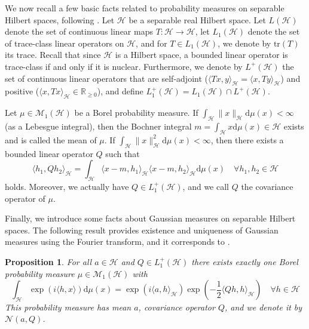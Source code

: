 \documentclass[letterpaper]{article} %
\newcommand{\R}{\mathbb{R}}
\newcommand{\Rnn}{\R_{\geq 0}}
\newcommand{\hs}[1]{\mathcal{#1}} %
\newcommand{\distributions}{\mathcal{M}_1} %
\newcommand{\Normal}{\mathcal{N}}
\newcommand{\tr}{\mathrm{tr}} %
\newtheorem{proposition}[theorem]{Proposition}
\begin{document}
We now recall a few basic facts related to probability measures on separable Hilbert spaces, following \cite{daprato2002second,daprato2006introduction}.
Let $\hs{H}$ be a separable real Hilbert space. %
Let $L(\hs{H})$ denote the set of continuous linear maps $T:\hs{H}\rightarrow\hs{H}$,
let $L_1(\hs{H})$ denote the set of trace-class linear operators on $\hs{H}$,
and for $T \in L_1(\hs{H})$, we denote by $\tr(T)$ its trace.
Recall that since $\hs{H}$ is a Hilbert space, a bounded linear operator is trace-class if and only if it is nuclear.
Furthermore, we denote by $L^+(\hs{H})$ the set of continuous linear operators that are self-adjoint ($\langle Tx,y\rangle_\hs{H}=\langle x,Ty\rangle_\hs{H}$) and positive ($\langle x, Tx\rangle_\hs{H} \in \Rnn$),
and define $L_1^+(\hs{H})=L_1(\hs{H})\cap L^+(\hs{H})$.

Let $\mu\in\distributions(\hs{H})$ be a Borel probability measure.
If $\int_\hs{H} \|x\|_\hs{H}\mathrm{d}\mu(x)<\infty$ (as a Lebesgue integral), then the Bochner integral $m=\int_\hs{H} x \mathrm{d}\mu(x)\in\hs{H}$ exists and is called the mean of $\mu$.
If $\int_\hs{H} \|x\|_\hs{H}^2\mathrm{d}\mu(x)<\infty$, then there exists a bounded linear operator $Q$ such that
\begin{equation*}
    \langle h_1, Q h_2\rangle_\hs{H} = \int_\hs{H} \langle x - m, h_1\rangle_\hs{H} \langle x - m, h_2\rangle_\hs{H} \mathrm{d}\mu(x)
    \quad \forall h_1,h_2\in\hs{H}
\end{equation*}
holds. Moreover, we actually have $Q\in L_1^+(\hs{H})$, and we call $Q$ the covariance operator of $\mu$.

Finally, we introduce some facts about Gaussian measures on separable Hilbert spaces.
The following result provides existence and uniqueness of Gaussian measures using the Fourier transform, and it corresponds to \cite[Theorem~1.12]{daprato2006introduction}.
\begin{proposition} \label{prop:gaussian:existenceUniquenessFourier}
For all $a\in\hs{H}$ and $Q\in L_1^+(\hs{H})$ there exists exactly one Borel probability measure $\mu\in\distributions(\hs{H})$ with
\begin{equation}
    \int_\hs{H} \exp(i\langle h,x\rangle) \mathrm{d}\mu(x) = \exp(i\langle a, h\rangle_\hs{H})\exp\left(-\frac12 \langle Qh, h\rangle_\hs{H}\right)
    \quad \forall h\in\hs{H}
\end{equation}
This probability measure has mean $a$, covariance operator $Q$, and we denote it by $\Normal(a,Q)$.
\end{proposition}
\end{document}
